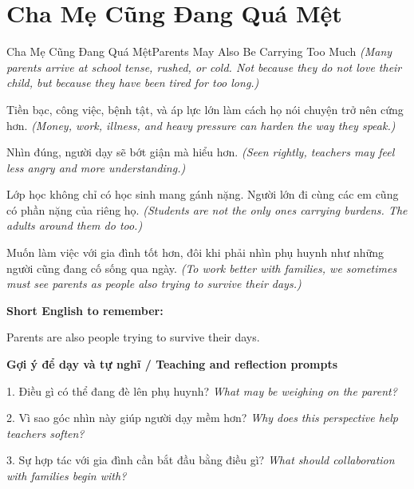 \section{Cha Mẹ Cũng Đang Quá Mệt}
\begin{truyen}{Cha Mẹ Cũng Đang Quá Mệt}{Parents May Also Be Carrying Too Much}
\textit{(Many parents arrive at school tense, rushed, or cold. Not because they do not love their child, but because they have been tired for too long.)}

Tiền bạc, công việc, bệnh tật, và áp lực lớn làm cách họ nói chuyện trở nên cứng hơn.
\textit{(Money, work, illness, and heavy pressure can harden the way they speak.)}

Nhìn đúng, người dạy sẽ bớt giận mà hiểu hơn.
\textit{(Seen rightly, teachers may feel less angry and more understanding.)}

Lớp học không chỉ có học sinh mang gánh nặng. Người lớn đi cùng các em cũng có phần nặng của riêng họ.
\textit{(Students are not the only ones carrying burdens. The adults around them do too.)}

\end{truyen}

\begin{baihoc}
Muốn làm việc với gia đình tốt hơn, đôi khi phải nhìn phụ huynh như những người cũng đang cố sống qua ngày.
\textit{(To work better with families, we sometimes must see parents as people also trying to survive their days.)}
\end{baihoc}

\begin{ghinhoanh}
\textbf{Short English to remember:}

Parents are also people trying to survive their days.

\end{ghinhoanh}

\begin{tuhocnhanh}
\textbf{Gợi ý để dạy và tự nghĩ / Teaching and reflection prompts}

1. Điều gì có thể đang đè lên phụ huynh? \textit{What may be weighing on the parent?}

2. Vì sao góc nhìn này giúp người dạy mềm hơn? \textit{Why does this perspective help teachers soften?}

3. Sự hợp tác với gia đình cần bắt đầu bằng điều gì? \textit{What should collaboration with families begin with?}
\end{tuhocnhanh}
\ngancach

